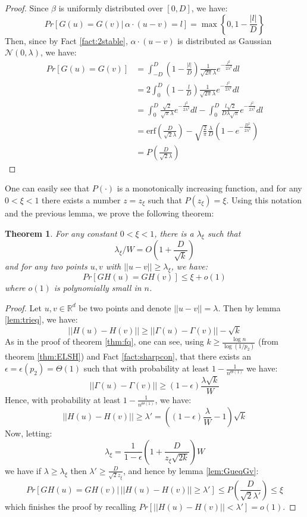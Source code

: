 \documentclass{acm_proc_article-sp}
\numberwithin{equation}{section}
\numberwithin{figure}{section}
\newtheorem{thm}{Theorem}
\begin{document}
\begin{proof} Since $\beta$ is uniformly distributed over $[0,D]$, we have:
\[
Pr[G(u)=G(v) |\, \alpha \cdot (u-v) = l] = \max\left\{0, 1-\frac{|l|}{D}\right\} 
\]
Then, since by Fact \ref{fact:2stable}, $\alpha \cdot (u-v)$ is distributed as Gaussian $\mathcal{N}(0,\lambda)$, we have:
\begin{align*}
Pr[G(u)=G(v)] &= \int_{-D}^{D} (1-\frac{|l|}{D})\frac{1}{\sqrt{2\pi}\lambda}e^{-\frac{l^2}{2\lambda^2}}dl\\
&= 2\int_{0}^{D} (1-\frac{l}{D})\frac{1}{\sqrt{2\pi}\lambda}e^{-\frac{l^2}{2\lambda^2}}dl\\
&= \int_{0}^{D} \frac{\sqrt{2}}{\sqrt{\pi}\lambda}e^{-\frac{l^2}{2\lambda^2}}dl - \int_{0}^{D} \frac{l\sqrt{2}}{D\lambda\sqrt{\pi}}e^{-\frac{l^2}{2\lambda^2}}dl\\
&= \mbox{erf}(\frac{D}{\sqrt{2}\lambda}) - \sqrt{\frac{2}{\pi}}\frac{\lambda}{D}(1-e^{-\frac{D^2}{2\lambda^2}}) \\
&= P(\frac{D}{\sqrt{2}\lambda})
\end{align*}
\end{proof}

One can easily see that $P(\cdot)$ is a monotonically increasing function, and for any $0<\xi<1$ there exists a number $z=z_\xi$ such that $P(z_\xi)=\xi$. Using this notation and the previous lemma, we prove the following theorem:

\begin{thm}
\label{thm:rc} For any constant $0<\xi<1$, there is a $\lambda_\xi$ such that
\[
\lambda_\xi/W =  O(1+\frac{D}{\sqrt{k}})
\]
and for any two points $u,v$ with $||u-v||\geq \lambda_\xi$, we have:
\[
Pr[GH(u)=GH(v)] \leq \xi + o(1)
\]
where $o(1)$ is polynomially small in $n$.
\end{thm}
\begin{proof}
Let $u,v\in\mathbb{R}^d$ be two points and denote $||u-v||=\lambda$. Then by lemma \ref{lem:trieq}, we have:
\[
||H(u)-H(v)|| \geq ||\Gamma(u)-\Gamma(v)|| - \sqrt{k} 
\]
As in the proof of theorem \ref{thm:fq}, one can see, using $k\geq \frac{\log n}{\log {(1/p_2)}}$ (from theorem \ref{thm:ELSH}) and Fact \ref{fact:sharpcon}, that there exists an $\epsilon = \epsilon(p_2)=\Theta(1)$ such that with probability at least $1-\frac{1}{n^{\Theta(1)}}$ we have:
\[
||\Gamma(u)-\Gamma(v)|| \geq (1-\epsilon) \frac{\lambda\sqrt{k}}{W}
\]
Hence, with probability at least $1-\frac{1}{n^{\Theta(1)}}$, we have:
\begin{equation*}
||H(u)-H(v)|| \geq \lambda' = ((1-\epsilon) \frac{\lambda}{W} - 1)\sqrt{k} 
\end{equation*}
Now, letting:
\[
\lambda_\xi = \frac{1}{1-\epsilon}(1+\frac{D}{z_\xi \sqrt{2k}})W
\]
we have if $\lambda \geq \lambda_\xi$ then $\lambda' \geq \frac{D}{\sqrt{2}{z_\xi}}$, and hence by lemma \ref{lem:GueqGv}:
\[
Pr[GH(u)=GH(v)|\, ||H(u)-H(v)|| \geq \lambda'] \leq P(\frac{D}{\sqrt{2}\lambda'}) \leq \xi
\]
which finishes the proof by recalling $Pr[||H(u)-H(v)|| < \lambda'] = o(1)$.
\end{proof}
\end{document}
